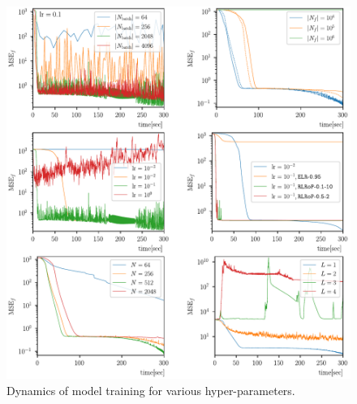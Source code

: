 \documentclass[reprint,
superscriptaddress,
amsmath,amssymb,aps,showkeys,showpacs,
twoside,final,secnumarabic,%
nofootinbib]{revtex4-2}
\begin{document}
\begin{figure}
	\includegraphics[width=\textwidth]{img/Manual HPO.pdf}
	\caption{Dynamics of model training for various hyper-parameters.}
	\label{Dynamics manual}
\end{figure}
\end{document}
